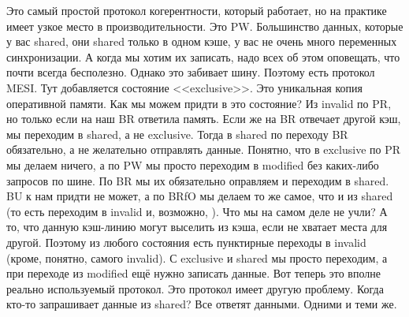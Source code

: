 \documentclass{article}
\begin{document}
    \begin{center}
    \end{center}
    Это самый простой протокол когерентности, который работает, но на практике имеет узкое место в производительности. Это {\color{red}PW}. Большинство данных, которые у вас shared, они shared только в одном кэше, у вас не очень много переменных синхронизации. А когда мы хотим их записать, надо всех об этом оповещать, что почти всегда бесполезно. Однако это забивает шину. Поэтому есть протокол MESI. Тут добавляется состояние <<exclusive>>. Это уникальная копия оперативной памяти. Как мы можем придти в это состояние? Из invalid по {\color{red}PR}, но только если на наш {\color{darkgreen}BR} ответила память. Если же на {\color{darkgreen}BR} отвечает другой кэш, мы переходим в shared, а не exclusive. Тогда в shared по переходу {\color{blue}BR} обязательно, а не желательно отправлять данные. Понятно, что в exclusive по {\color{red}PR} мы делаем ничего, а по {\color{red}PW} мы просто переходим в modified без каких-либо запросов по шине. По {\color{blue}BR} мы их обязательно оправляем и переходим в shared. {\color{blue}BU} к нам придти не может, а по {\color{blue}BRfO} мы делаем то же самое, что и из shared (то есть переходим в invalid и, возможно, {\color{darkgreen}}). Что мы на самом деле не учли? А то, что данную кэш-линию могут выселить из кэша, если не хватает места для другой. Поэтому из любого состояния есть пунктирные переходы в invalid (кроме, понятно, самого invalid). С exclusive и shared мы просто переходим, а при переходе из modified ещё нужно записать данные. Вот теперь это вполне реально используемый протокол. Это протокол имеет другую проблему. Когда кто-то запрашивает данные из shared? Все ответят данными. Одними и теми же.
\end{document}
